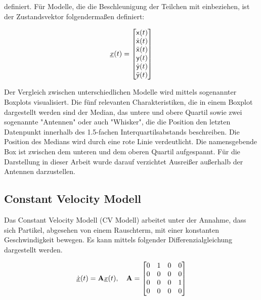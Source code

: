 definiert.
Für Modelle, die die Beschleunigung der Teilchen mit einbeziehen, ist der Zustandsvektor folgendermaßen definiert:

\begin{equation} \label{eq:definitionCA}
    {\underline{x}}(t) = 
    \begin{bmatrix}
        \mathsf{x}(t) \\
        \dot{\mathsf{x}}(t) \\
        \ddot{\mathsf{x}}(t) \\
        \mathsf{y}(t) \\
        \dot{\mathsf{y}}(t) \\
        \ddot{\mathsf{y}}(t)
       \end{bmatrix} 
\end{equation}

Der Vergleich zwischen unterschiedlichen Modelle wird mittels sogenannter Boxplots visualisiert.
Die fünf relevanten Charakteristiken, die in einem Boxplot dargestellt werden sind 
der Median, das untere und obere Quartil sowie zwei sogenannte "Antennen" oder auch "Whisker", die die Position den letzten Datenpunkt innerhalb des 1.5-fachen Interquartilsabstands beschreiben.
Die Position des Medians wird durch eine rote Linie verdeutlicht.
Die namensgebende Box ist zwischen dem unteren und dem oberen Quartil aufgespannt.
Für die Darstellung in dieser Arbeit wurde darauf verzichtet Ausreißer außerhalb der Antennen darzustellen.



\subsection{Constant Velocity Modell}

Das Constant Velocity Modell (CV Modell) arbeitet unter der Annahme, dass sich Partikel, 
abgesehen von einem Rauschterm, mit einer konstanten Geschwindigkeit bewegen.
Es kann mittels folgender Differenzialgleichung dargestellt werden.

\begin{equation*} \label{eq:speedCV}
    \dot{{\underline{x}}}(t) = {{\mathbf{A}}}{\underline{x}}(t), \quad {\ensuremath{{\mathbf{A}}}} = 
    \begin{bmatrix}
        0 & 1 & 0 & 0 \\
        0 & 0 & 0 & 0 \\
        0 & 0 & 0 & 1\\
        0 & 0 & 0 & 0
    \end{bmatrix} 
\end{equation*}

